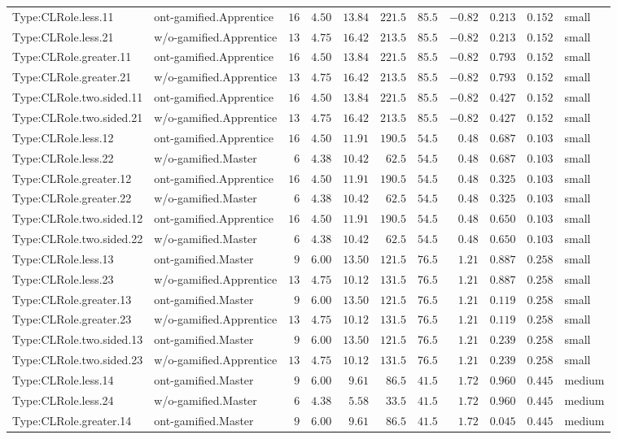 \documentclass[6pt,a4paper]{article}
\begin{document}
{\begin{longtable}{llrrrrrrrrl}
Type:CLRole.less.11&ont-gamified.Apprentice&$16$&$4.50$&$13.84$&$221.5$&$ 85.5$&$-0.82$&$0.213$&$0.152$&small\tabularnewline
Type:CLRole.less.21&w/o-gamified.Apprentice&$13$&$4.75$&$16.42$&$213.5$&$ 85.5$&$-0.82$&$0.213$&$0.152$&small\tabularnewline
Type:CLRole.greater.11&ont-gamified.Apprentice&$16$&$4.50$&$13.84$&$221.5$&$ 85.5$&$-0.82$&$0.793$&$0.152$&small\tabularnewline
Type:CLRole.greater.21&w/o-gamified.Apprentice&$13$&$4.75$&$16.42$&$213.5$&$ 85.5$&$-0.82$&$0.793$&$0.152$&small\tabularnewline
Type:CLRole.two.sided.11&ont-gamified.Apprentice&$16$&$4.50$&$13.84$&$221.5$&$ 85.5$&$-0.82$&$0.427$&$0.152$&small\tabularnewline
Type:CLRole.two.sided.21&w/o-gamified.Apprentice&$13$&$4.75$&$16.42$&$213.5$&$ 85.5$&$-0.82$&$0.427$&$0.152$&small\tabularnewline
Type:CLRole.less.12&ont-gamified.Apprentice&$16$&$4.50$&$11.91$&$190.5$&$ 54.5$&$ 0.48$&$0.687$&$0.103$&small\tabularnewline
Type:CLRole.less.22&w/o-gamified.Master&$ 6$&$4.38$&$10.42$&$ 62.5$&$ 54.5$&$ 0.48$&$0.687$&$0.103$&small\tabularnewline
Type:CLRole.greater.12&ont-gamified.Apprentice&$16$&$4.50$&$11.91$&$190.5$&$ 54.5$&$ 0.48$&$0.325$&$0.103$&small\tabularnewline
Type:CLRole.greater.22&w/o-gamified.Master&$ 6$&$4.38$&$10.42$&$ 62.5$&$ 54.5$&$ 0.48$&$0.325$&$0.103$&small\tabularnewline
Type:CLRole.two.sided.12&ont-gamified.Apprentice&$16$&$4.50$&$11.91$&$190.5$&$ 54.5$&$ 0.48$&$0.650$&$0.103$&small\tabularnewline
Type:CLRole.two.sided.22&w/o-gamified.Master&$ 6$&$4.38$&$10.42$&$ 62.5$&$ 54.5$&$ 0.48$&$0.650$&$0.103$&small\tabularnewline
Type:CLRole.less.13&ont-gamified.Master&$ 9$&$6.00$&$13.50$&$121.5$&$ 76.5$&$ 1.21$&$0.887$&$0.258$&small\tabularnewline
Type:CLRole.less.23&w/o-gamified.Apprentice&$13$&$4.75$&$10.12$&$131.5$&$ 76.5$&$ 1.21$&$0.887$&$0.258$&small\tabularnewline
Type:CLRole.greater.13&ont-gamified.Master&$ 9$&$6.00$&$13.50$&$121.5$&$ 76.5$&$ 1.21$&$0.119$&$0.258$&small\tabularnewline
Type:CLRole.greater.23&w/o-gamified.Apprentice&$13$&$4.75$&$10.12$&$131.5$&$ 76.5$&$ 1.21$&$0.119$&$0.258$&small\tabularnewline
Type:CLRole.two.sided.13&ont-gamified.Master&$ 9$&$6.00$&$13.50$&$121.5$&$ 76.5$&$ 1.21$&$0.239$&$0.258$&small\tabularnewline
Type:CLRole.two.sided.23&w/o-gamified.Apprentice&$13$&$4.75$&$10.12$&$131.5$&$ 76.5$&$ 1.21$&$0.239$&$0.258$&small\tabularnewline
Type:CLRole.less.14&ont-gamified.Master&$ 9$&$6.00$&$ 9.61$&$ 86.5$&$ 41.5$&$ 1.72$&$0.960$&$0.445$&medium\tabularnewline
Type:CLRole.less.24&w/o-gamified.Master&$ 6$&$4.38$&$ 5.58$&$ 33.5$&$ 41.5$&$ 1.72$&$0.960$&$0.445$&medium\tabularnewline
Type:CLRole.greater.14&ont-gamified.Master&$ 9$&$6.00$&$ 9.61$&$ 86.5$&$ 41.5$&$ 1.72$&$0.045$&$0.445$&medium\tabularnewline

\end{longtable}}
\end{document}
